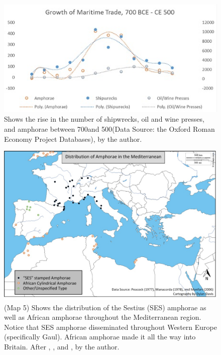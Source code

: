 	\begin{figure}[!p]
		\includegraphics[width=\linewidth]{figures/Davis_Agroeconomy_Fig7b.jpg}
		\centering
		\caption{Shows the rise in the number of shipwrecks, oil and wine presses, and amphorae between 700\BC and  500\AD (Data Source: the Oxford Roman Economy Project Databases), by the author.}
		\label{fig:DavisFig7b}
	\end{figure}
	
	
	\begin{figure}[!p]
		\includegraphics[width=\linewidth]{figures/Davis_Agroeconomy_Map5.jpg}
		\centering
		\caption{(Map 5) Shows the distribution of the Sestius (SES) amphorae as well as African amphorae throughout the Mediterranean region. Notice that SES amphorae disseminated throughout Western Europe (specifically Gaul). African amphorae made it all the way into Britain. After \textcite{Peacock_1977}, \textcite{Manacorda_1978}, and \textcite{Monfort_2006}, by the author.}
		\label{fig:DavisMap5}
	\end{figure}
	
